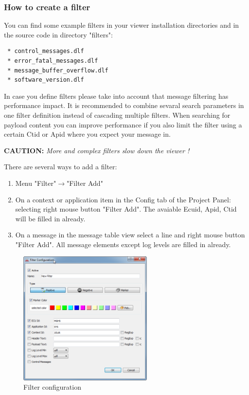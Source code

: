 \documentclass[a4paper,11pt]{article}
\newcommand{\caution}[1]{\begin{ibox} \textbf{CAUTION:} \emph{#1} \end{ibox}}
\begin{document}
\subsubsection{How to create a filter}

You can find some example filters in your viewer installation directories and in the source code in directory "filters":
\begin{verbatim}
 * control_messages.dlf
 * error_fatal_messages.dlf
 * message_buffer_overflow.dlf
 * software_version.dlf
\end{verbatim}

In case you define filters please take into account that message filtering has performance impact. It is recommended to combine sevaral search parameters in one filter definition instead of cascading multiple filters.
When searching for payload content you can improve performance if you also limit the filter using a certain Ctid or Apid where you expect your message in.

\caution{More and complex filters slow down the viewer !}

There are several ways to add a filter:
\begin{enumerate}
\item Menu "Filter"\ensuremath{\rightarrow}"Filter Add"
\item On a context or application item in the Config tab of the Project Panel: selecting right mouse button "Filter Add".
The avaiable Ecuid, Apid, Ctid will be filled in already.
\item On a message in the message table view select a line and right mouse button "Filter Add". All message elements except log levels are filled in already.
\end{enumerate}


\label{createfilter}
\begin{figure}[H]
 \centering
  \includegraphics[width=0.6\textwidth]{images/Filter_Configuration.png}
 \caption{Filter configuration}
 \label{fig:filterconfiguration}
\end{figure}
\end{document}
